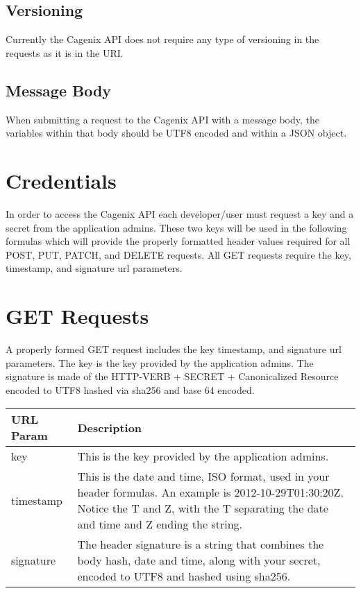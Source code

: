 \documentclass[letterpaper,10pt,english]{sphinxmanual}
\begin{document}
\subsection{Versioning}
\label{dev-api-overview:versioning}
Currently the Cagenix API does not require any type of versioning in the
requests as it is in the URI.


\subsection{Message Body}
\label{dev-api-overview:message-body}
When submitting a request to the Cagenix API with a message body, the
variables within that body should be UTF8 encoded and within a JSON object.


\section{Credentials}
\label{dev-api-overview:credentials}
In order to access the Cagenix API each developer/user must request a key and
a secret from the application admins. These two keys will be used in the
following formulas which will provide the properly formatted header values
required for all POST, PUT, PATCH, and DELETE requests. All GET requests require
the key, timestamp, and signature url parameters.


\section{GET Requests}
\label{dev-api-overview:get-requests}
A properly formed GET request includes the key timestamp, and signature url
parameters. The key is the key provided by the application admins.  The
signature is made of the HTTP-VERB + SECRET + Canonicalized Resource encoded to
UTF8 hashed via sha256 and base 64 encoded.

\begin{tabulary}{\linewidth}{|L|L|}
\hline
\textsf{\relax 
URL Param
} & \textsf{\relax 
Description
}\\
\hline
key
 & 
This is the key provided by the application admins.
\\

timestamp
 & 
This is the date and time, ISO format, used in your
header formulas. An example is 2012-10-29T01:30:20Z.
Notice the T and Z, with the T separating the date and
time and Z ending the string.
\\

signature
 & 
The header signature is a string that combines the body
hash, date and time, along with your secret, encoded to
UTF8 and hashed using sha256.
\\
\hline\end{tabulary}
\end{document}
